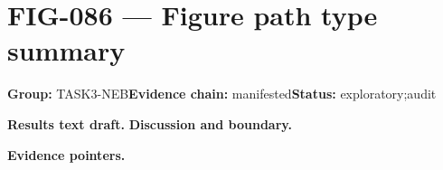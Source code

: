 \clearpage
\section{FIG-086 --- Figure path type summary}
\label{figpage:fig-086}
\textbf{Group:} TASK3-NEB\quad \textbf{Evidence chain:} manifested\quad \textbf{Status:} exploratory;audit

\textbf{Results text draft.} 
\textbf{Discussion and boundary.} 


\textbf{Evidence pointers.}



\vfill
